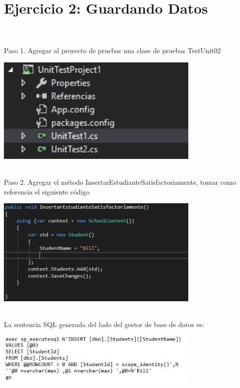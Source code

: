\section{Ejercicio 2: Guardando Datos} 

\textbf{}\\
\textbf{}\\
Paso 1. Agregar al proyecto de pruebas una clase de pruebas TestUnit02

\begin{center}
	\includegraphics[width=10cm]{./Imagenes/Captura8} 
	\end{center}
\textbf{}\\
Paso 2. Agregar el método InsertarEstudianteSatisfactoriamente, tomar como referencia el siguiente código
\begin{center}
	\includegraphics[width=10cm]{./Imagenes/Captura9} 
	\end{center}
\textbf{}\\
La sentencia SQL generada del lado del gestor de base de datos es:
\begin{center}
	\includegraphics[width=10cm]{./Imagenes/U1-7} 
	\end{center}
\textbf{}\\
